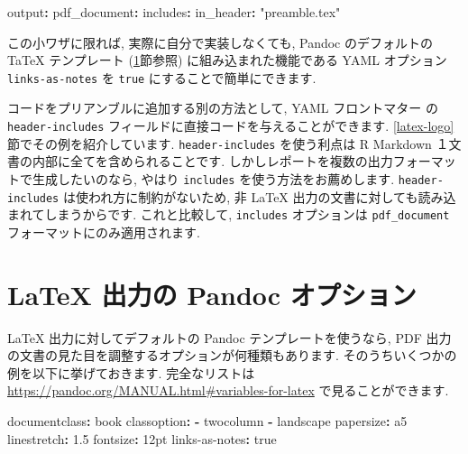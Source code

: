 \documentclass[
  11pt,
  lualatex,ja=standard,jafont=noto]{bxjsreport}
\newenvironment{Shaded}{\begin{snugshade}}{\end{snugshade}}
\newcommand{\AttributeTok}[1]{\textcolor[rgb]{0.77,0.63,0.00}{#1}}
\newcommand{\CharTok}[1]{\textcolor[rgb]{0.31,0.60,0.02}{#1}}
\newcommand{\FloatTok}[1]{\textcolor[rgb]{0.00,0.00,0.81}{#1}}
\newcommand{\FunctionTok}[1]{\textcolor[rgb]{0.00,0.00,0.00}{#1}}
\newcommand{\KeywordTok}[1]{\textcolor[rgb]{0.13,0.29,0.53}{\textbf{#1}}}
\newcommand{\StringTok}[1]{\textcolor[rgb]{0.31,0.60,0.02}{#1}}
\begin{document}
\begin{Shaded}
\begin{Highlighting}[]
\FunctionTok{output}\KeywordTok{:}
\AttributeTok{  }\FunctionTok{pdf\_document}\KeywordTok{:}
\AttributeTok{    }\FunctionTok{includes}\KeywordTok{:}
\AttributeTok{      }\FunctionTok{in\_header}\KeywordTok{:}\AttributeTok{ }\StringTok{"preamble.tex"}
\end{Highlighting}
\end{Shaded}

この小ワザに限れば, 実際に自分で実装しなくても, Pandoc のデフォルトの TaTeX テンプレート (\ref{latex-variables}節参照) に組み込まれた機能である YAML オプション \texttt{links-as-notes} を \texttt{true} にすることで簡単にできます.

コードをプリアンブルに追加する別の方法として, YAML フロントマター の \texttt{header-includes} フィールドに直接コードを与えることができます. \ref{latex-logo}節でその例を紹介しています. \texttt{header-includes} を使う利点は R Markdown １文書の内部に全てを含められることです. しかしレポートを複数の出力フォーマットで生成したいのなら, やはり \texttt{includes} を使う方法をお薦めします. \texttt{header-includes} は使われ方に制約がないため, 非 LaTeX 出力の文書に対しても読み込まれてしまうからです. これと比較して, \texttt{includes} オプションは \texttt{pdf\_document} フォーマットにのみ適用されます.

\hypertarget{latex-variables}{%
\section{LaTeX 出力の Pandoc オプション}\label{latex-variables}}

LaTeX 出力に対してデフォルトの Pandoc テンプレートを使うなら, PDF 出力の文書の見た目を調整するオプションが何種類もあります. そのうちいくつかの例を以下に挙げておきます. 完全なリストは \url{https://pandoc.org/MANUAL.html\#variables-for-latex} で見ることができます.

\begin{Shaded}
\begin{Highlighting}[]
\FunctionTok{documentclass}\KeywordTok{:}\AttributeTok{ book}
\FunctionTok{classoption}\KeywordTok{:}
\AttributeTok{  }\KeywordTok{{-}}\AttributeTok{ twocolumn}
\AttributeTok{  }\KeywordTok{{-}}\AttributeTok{ landscape}
\FunctionTok{papersize}\KeywordTok{:}\AttributeTok{ a5}
\FunctionTok{linestretch}\KeywordTok{:}\AttributeTok{ }\FloatTok{1.5}
\FunctionTok{fontsize}\KeywordTok{:}\AttributeTok{ 12pt}
\FunctionTok{links{-}as{-}notes}\KeywordTok{:}\AttributeTok{ }\CharTok{true}
\end{Highlighting}
\end{Shaded}
\end{document}
